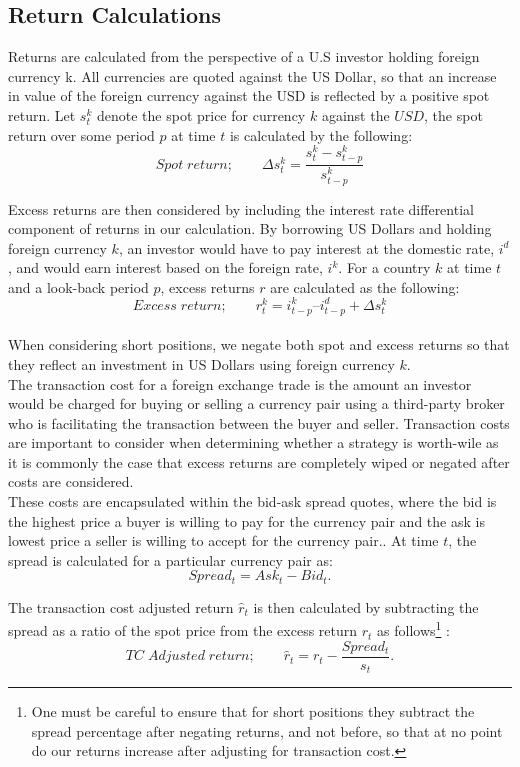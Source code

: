 \documentclass{article}
\begin{document}
\subsection{Return Calculations}
Returns are calculated from the perspective of a U.S investor holding foreign currency k.
All currencies are quoted against the US Dollar, so that an increase in value of the foreign currency against the USD is reflected by a positive spot return. Let $s^k_{t}$ denote the spot price for currency $k$ against the $USD$, the spot return over some period $p$ at time $t$ is calculated by the following:
$$Spot\;return;\qquad \Delta{}s^k_{t} = \frac{s^k_{t}-s^k_{t-p}}{s^k_{t-p}}$$

 Excess returns are then considered by including the interest rate differential component of returns in our calculation. By borrowing US Dollars and holding foreign currency $k$, an investor would have to pay interest at the domestic rate, $i^d$, and would earn interest based on the foreign rate, $i^k$. For a country $k$ at time $t$ and a look-back period $p$, excess returns $r$ are calculated as the following:
\\
$$Excess\;return;\qquad r^k_{t} = i^k_{t-p} – i^d_{t-p} + \Delta s^k_{t}$$
\\ 
When considering short positions, we negate both spot and excess returns so that they reflect an investment in US Dollars using foreign currency $k$. 
\\

The transaction cost for a foreign exchange trade is the amount an investor would be charged for buying or selling a currency pair using a third-party broker who is facilitating the transaction between the buyer and seller. Transaction costs are important to consider when determining whether a strategy is worth-wile as it is commonly the case that excess returns are completely wiped or negated after costs are considered.\\

These costs are encapsulated within the bid-ask spread quotes, where the bid is the highest price a buyer is willing to pay for the currency pair and the ask is lowest price a seller is willing to accept for the currency pair.. At time $t$, the spread is calculated for a particular currency pair as:
$$Spread_t = Ask_t - Bid_t.$$

 The transaction cost adjusted return $\hat{r}_t$ is then calculated by subtracting the spread as a ratio of the spot price from the excess return $r_t$ as follows\footnote{One must be careful to ensure that for short positions they subtract the spread percentage after negating returns, and not before, so that at no point do our returns increase after adjusting for transaction cost.} : 
$$TC\;Adjusted\;return;\qquad \hat{r}_t = r_t - \frac{Spread_t}{s_t}.$$
\end{document}
